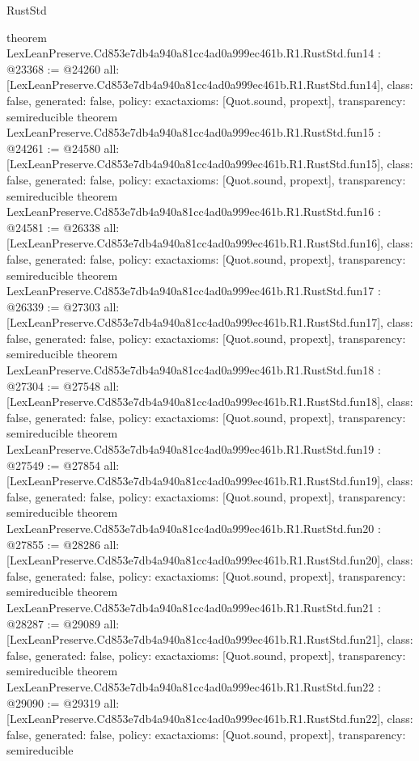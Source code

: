 \begin{lexlean}{RustStd}
\begin{coremodule}
{}
theorem LexLeanPreserve.Cd853e7db4a940a81cc4ad0a999ec461b.R1.RustStd.fun14 : @23368 := @24260 {
  all: [LexLeanPreserve.Cd853e7db4a940a81cc4ad0a999ec461b.R1.RustStd.fun14],
  class: false,
  generated: false,
  policy: exact{axioms: [Quot.sound, propext]},
  transparency: semireducible
}
theorem LexLeanPreserve.Cd853e7db4a940a81cc4ad0a999ec461b.R1.RustStd.fun15 : @24261 := @24580 {
  all: [LexLeanPreserve.Cd853e7db4a940a81cc4ad0a999ec461b.R1.RustStd.fun15],
  class: false,
  generated: false,
  policy: exact{axioms: [Quot.sound, propext]},
  transparency: semireducible
}
theorem LexLeanPreserve.Cd853e7db4a940a81cc4ad0a999ec461b.R1.RustStd.fun16 : @24581 := @26338 {
  all: [LexLeanPreserve.Cd853e7db4a940a81cc4ad0a999ec461b.R1.RustStd.fun16],
  class: false,
  generated: false,
  policy: exact{axioms: [Quot.sound, propext]},
  transparency: semireducible
}
theorem LexLeanPreserve.Cd853e7db4a940a81cc4ad0a999ec461b.R1.RustStd.fun17 : @26339 := @27303 {
  all: [LexLeanPreserve.Cd853e7db4a940a81cc4ad0a999ec461b.R1.RustStd.fun17],
  class: false,
  generated: false,
  policy: exact{axioms: [Quot.sound, propext]},
  transparency: semireducible
}
theorem LexLeanPreserve.Cd853e7db4a940a81cc4ad0a999ec461b.R1.RustStd.fun18 : @27304 := @27548 {
  all: [LexLeanPreserve.Cd853e7db4a940a81cc4ad0a999ec461b.R1.RustStd.fun18],
  class: false,
  generated: false,
  policy: exact{axioms: [Quot.sound, propext]},
  transparency: semireducible
}
theorem LexLeanPreserve.Cd853e7db4a940a81cc4ad0a999ec461b.R1.RustStd.fun19 : @27549 := @27854 {
  all: [LexLeanPreserve.Cd853e7db4a940a81cc4ad0a999ec461b.R1.RustStd.fun19],
  class: false,
  generated: false,
  policy: exact{axioms: [Quot.sound, propext]},
  transparency: semireducible
}
theorem LexLeanPreserve.Cd853e7db4a940a81cc4ad0a999ec461b.R1.RustStd.fun20 : @27855 := @28286 {
  all: [LexLeanPreserve.Cd853e7db4a940a81cc4ad0a999ec461b.R1.RustStd.fun20],
  class: false,
  generated: false,
  policy: exact{axioms: [Quot.sound, propext]},
  transparency: semireducible
}
theorem LexLeanPreserve.Cd853e7db4a940a81cc4ad0a999ec461b.R1.RustStd.fun21 : @28287 := @29089 {
  all: [LexLeanPreserve.Cd853e7db4a940a81cc4ad0a999ec461b.R1.RustStd.fun21],
  class: false,
  generated: false,
  policy: exact{axioms: [Quot.sound, propext]},
  transparency: semireducible
}
theorem LexLeanPreserve.Cd853e7db4a940a81cc4ad0a999ec461b.R1.RustStd.fun22 : @29090 := @29319 {
  all: [LexLeanPreserve.Cd853e7db4a940a81cc4ad0a999ec461b.R1.RustStd.fun22],
  class: false,
  generated: false,
  policy: exact{axioms: [Quot.sound, propext]},
  transparency: semireducible
}
\end{coremodule}
\end{lexlean}
